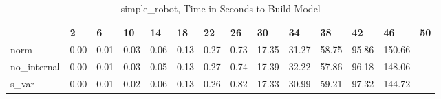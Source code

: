 \begin{table}
\caption{simple_robot, Time in Seconds to Build Model}
\label{simple_robot_model_time}
\begin{tabular}{llllllllllllll}
\toprule
 & 2 & 6 & 10 & 14 & 18 & 22 & 26 & 30 & 34 & 38 & 42 & 46 & 50 \\
\midrule
norm & 0.00 & 0.01 & 0.03 & 0.06 & 0.13 & 0.27 & 0.73 & 17.35 & 31.27 & 58.75 & 95.86 & 150.66 & - \\
no_internal & 0.00 & 0.01 & 0.03 & 0.05 & 0.13 & 0.27 & 0.74 & 17.39 & 32.22 & 57.86 & 96.18 & 148.06 & - \\
s_var & 0.00 & 0.01 & 0.02 & 0.06 & 0.13 & 0.26 & 0.82 & 17.33 & 30.99 & 59.21 & 97.32 & 144.72 & - \\
\bottomrule
\end{tabular}
\end{table}

